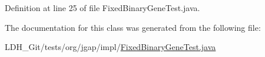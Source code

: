 Definition at line 25 of file Fixed\-Binary\-Gene\-Test.\-java.



The documentation for this class was generated from the following file\-:\begin{DoxyCompactItemize}
\item 
L\-D\-H\-\_\-\-Git/tests/org/jgap/impl/\hyperlink{_fixed_binary_gene_test_8java}{Fixed\-Binary\-Gene\-Test.\-java}\end{DoxyCompactItemize}
